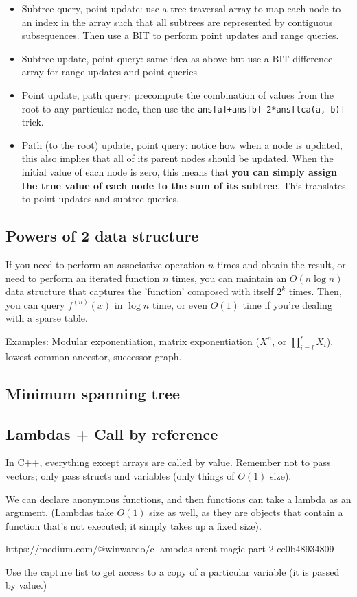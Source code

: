 \documentclass[12pt]{article}
\newcommand{\code}[1]{\texttt{#1}}
\begin{document}
\begin{itemize}

    \item Subtree query, point update: use a tree traversal array to map each node to an index in the array such that
          all subtrees are represented by contiguous subsequences. Then use a BIT to perform point updates and range queries.

    \item Subtree update, point query: same idea as above but use a BIT difference array for range updates and point queries
    
    \item Point update, path query: precompute the combination of values from the root to any particular node, then use 
    the \code{ans[a]+ans[b]-2*ans[lca(a, b)]} trick.

    \item Path (to the root) update, point query: notice how when a node is updated, this also implies that all of its 
    parent nodes should be updated. When the initial value of each node is zero, this means that \textbf{you can simply 
    assign the true value of each node to the sum of its subtree}. This translates to point updates and subtree queries.

\end{itemize}


\subsection{Powers of 2 data structure}
If you need to perform an associative operation
$n$ times and obtain the result, or need to perform an iterated function
$n$ times, you can maintain an $O(n\log n)$ data structure
that captures the 'function' composed with itself
$2^k$ times. Then, you can query $f^{(n)}(x)$ in $\log n$ time, or even $O(1)$ time
if you're dealing with a sparse table.

Examples: Modular exponentiation, matrix exponentiation ($X^n$, or $\prod_{i=l}^r X_i$), lowest common ancestor,
successor graph.

\subsection{Minimum spanning tree}

\subsection{Lambdas + Call by reference}

In C++, everything except arrays are called by value. Remember not to pass vectors; only pass structs and
variables (only things of $O(1)$ size).

We can declare anonymous functions, and then functions can take a lambda as an argument. (Lambdas take $O(1)$ size as well,
as they are objects that contain a function that's not executed; it simply takes up a fixed size).

https://medium.com/@winwardo/c-lambdas-arent-magic-part-2-ce0b48934809


Use the capture list to get access to a copy of a particular variable (it is passed by value.)
\end{document}
